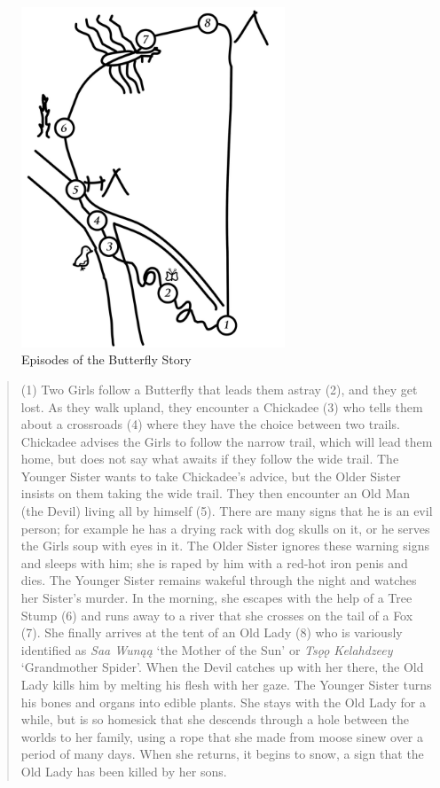 \begin{figure}[!ht]
    \centering
    \includegraphics[width=0.7\textwidth]{figures/brucks-fig1} %
    \caption{Episodes of the Butterfly Story}
    \label{brucks:fig:epmap}
\end{figure}

\begin{quote}
(1) Two Girls follow a Butterfly that leads them astray (2), and they get lost. As they walk upland, they encounter a Chickadee (3) who tells them about a crossroads (4) where they have the choice between two trails. Chickadee advises the Girls to follow the narrow trail, which will lead them home, but does not say what awaits if they follow the wide trail. The Younger Sister wants to take Chickadee's advice, but the Older Sister insists on them taking the wide trail. They then encounter an Old Man (the Devil) living all by himself (5). There are many signs that he is an evil person; for example he has a drying rack with dog skulls on it, or he serves the Girls soup with eyes in it. The Older Sister ignores these warning signs and sleeps with him; she is raped by him with a red-hot iron penis and dies. The Younger Sister remains wakeful through the night and watches her Sister's murder. In the morning, she escapes with the help of a Tree Stump (6) and runs away to a river that she crosses on the tail of a Fox (7). She finally arrives at the tent of an Old Lady (8) who is variously identified as {\em Saa Wunąą} `the Mother of the Sun' or {\em Tsǫǫ Kelahdzeey} `Grandmother Spider'. When the Devil catches up with her there, the Old Lady kills him by melting his flesh with her gaze. The Younger Sister turns his bones and organs into edible plants. She stays with the Old Lady for a while, but is so homesick that she descends through a hole between the worlds to her family, using a rope that she made from moose sinew over a period of many days. When she returns, it begins to snow, a sign that the Old Lady has been killed by her sons.
\end{quote}

